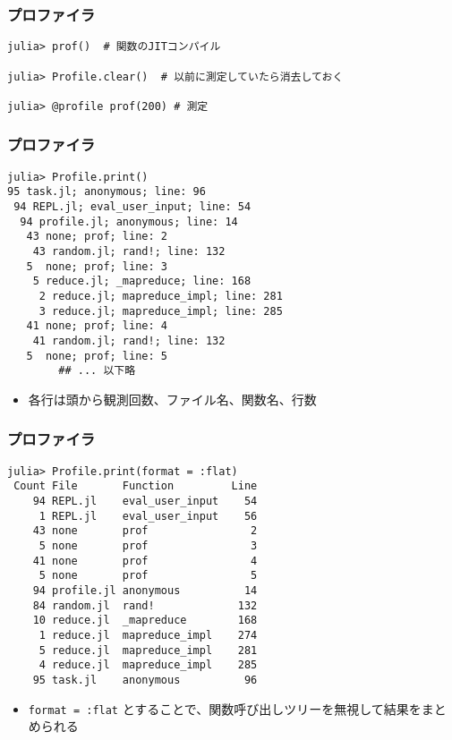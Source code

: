 \begin{frame}[containsverbatim]
\frametitle{プロファイラ}
\begin{lstlisting}
julia> prof()  # 関数のJITコンパイル

julia> Profile.clear()  # 以前に測定していたら消去しておく

julia> @profile prof(200) # 測定
\end{lstlisting}
\end{frame}

\begin{frame}[containsverbatim]
\frametitle{プロファイラ}
\begin{lstlisting}
julia> Profile.print()
95 task.jl; anonymous; line: 96
 94 REPL.jl; eval_user_input; line: 54
  94 profile.jl; anonymous; line: 14
   43 none; prof; line: 2
    43 random.jl; rand!; line: 132
   5  none; prof; line: 3
    5 reduce.jl; _mapreduce; line: 168
     2 reduce.jl; mapreduce_impl; line: 281
     3 reduce.jl; mapreduce_impl; line: 285
   41 none; prof; line: 4
    41 random.jl; rand!; line: 132
   5  none; prof; line: 5
        ## ... 以下略
 \end{lstlisting}
 \begin{itemize}
   \item 各行は頭から観測回数、ファイル名、関数名、行数
 \end{itemize}
 \end{frame}
 
 \begin{frame}[containsverbatim]
  \frametitle{プロファイラ}
  \begin{lstlisting}
julia> Profile.print(format = :flat)
 Count File       Function         Line
    94 REPL.jl    eval_user_input    54
     1 REPL.jl    eval_user_input    56
    43 none       prof                2
     5 none       prof                3
    41 none       prof                4
     5 none       prof                5
    94 profile.jl anonymous          14
    84 random.jl  rand!             132
    10 reduce.jl  _mapreduce        168
     1 reduce.jl  mapreduce_impl    274
     5 reduce.jl  mapreduce_impl    281
     4 reduce.jl  mapreduce_impl    285
    95 task.jl    anonymous          96
  \end{lstlisting}
  \begin{itemize}
    \item \verb|format = :flat| とすることで、関数呼び出しツリーを無視して結果をまとめられる
  \end{itemize}
\end{frame}

